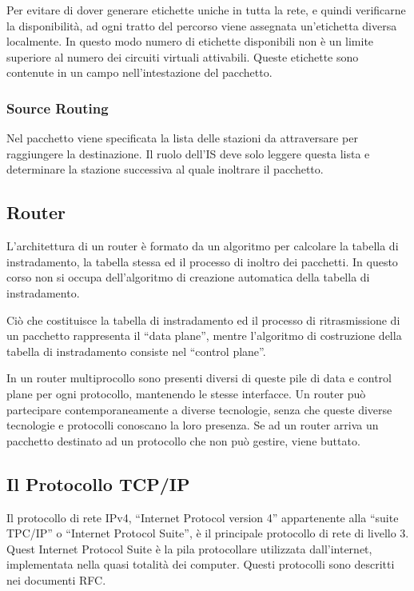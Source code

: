 \documentclass{article}
\numberwithin{equation}{subsection}
\begin{document}
Per evitare di dover generare etichette uniche in tutta la rete, e quindi verificarne la disponibilità, ad ogni tratto del percorso viene assegnata un'etichetta 
diversa localmente. 
In questo modo numero di etichette disponibili non è un limite superiore al numero dei circuiti virtuali attivabili. Queste etichette sono contenute in un campo 
nell'intestazione del pacchetto. 

\subsubsection{Source Routing}

Nel pacchetto viene specificata la lista delle stazioni da attraversare per raggiungere la destinazione. Il ruolo dell'IS deve solo leggere questa lista e determinare 
la stazione successiva al quale inoltrare il pacchetto. 

\subsection{Router}

L'architettura di un router è formato da un algoritmo per calcolare la tabella di instradamento, la tabella stessa ed il processo di inoltro dei pacchetti. In questo 
corso non si occupa dell'algoritmo di creazione automatica della tabella di instradamento. 

Ciò che costituisce la tabella di instradamento ed il processo di ritrasmissione di un pacchetto rappresenta il ``data plane'', mentre l'algoritmo di costruzione 
della tabella di instradamento consiste nel ``control plane''. 

In un router multiprocollo sono presenti diversi di queste pile di data e control plane per ogni protocollo, mantenendo le stesse interfacce. 
Un router può partecipare contemporaneamente a diverse tecnologie, senza che queste diverse tecnologie e protocolli conoscano la loro presenza. Se ad un router 
arriva un pacchetto destinato ad un protocollo che non può gestire, viene buttato. 

\subsection{Il Protocollo TCP/IP}

Il protocollo di rete IPv4, ``Internet Protocol version 4'' appartenente alla ``suite TPC/IP'' o ``Internet Protocol Suite'', è il principale protocollo di rete 
di livello 3. Quest Internet Protocol Suite è la pila protocollare utilizzata dall'internet, implementata nella quasi totalità dei computer. Questi protocolli 
sono descritti nei documenti RFC. 
\end{document}
